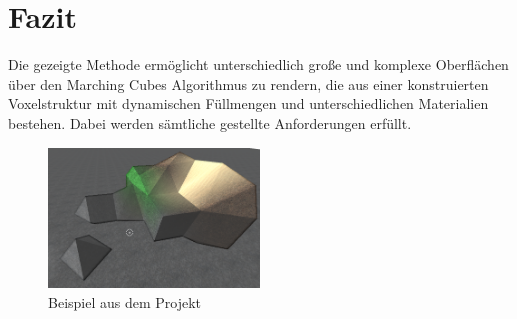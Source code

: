 
\section{Fazit}
\label{sec:fazit}
Die gezeigte Methode ermöglicht unterschiedlich große und komplexe Oberflächen über den Marching Cubes Algorithmus zu rendern, die aus einer konstruierten Voxelstruktur mit dynamischen Füllmengen und unterschiedlichen Materialien bestehen. Dabei werden sämtliche gestellte Anforderungen erfüllt.

\begin{figure}[H]
			\centering
			\includegraphics[width=0.5\textwidth]{figures/ProjectImage}
			\caption[Beispiel aus dem Projekt\cite{project}]{Beispiel aus dem Projekt \label{MarchingCubesPossibilities}}
\end{figure}